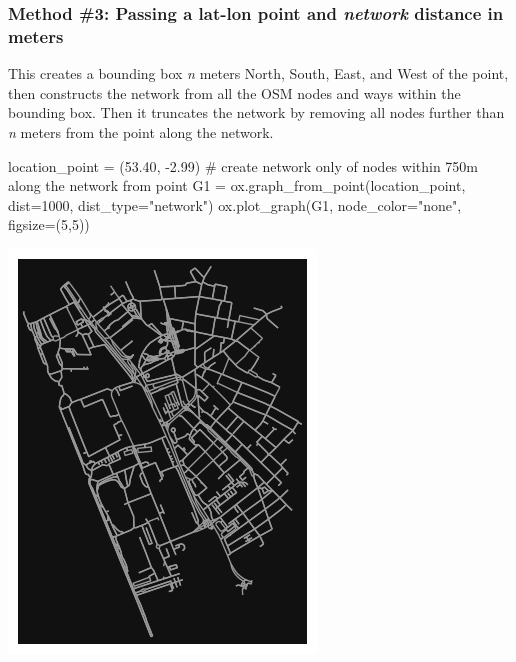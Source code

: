 \documentclass[
  letterpaper,
  DIV=11,
  numbers=noendperiod]{scrreprt}
\newenvironment{Shaded}{\begin{snugshade}}{\end{snugshade}}
\newcommand{\CommentTok}[1]{\textcolor[rgb]{0.37,0.37,0.37}{#1}}
\newcommand{\DecValTok}[1]{\textcolor[rgb]{0.68,0.00,0.00}{#1}}
\newcommand{\FloatTok}[1]{\textcolor[rgb]{0.68,0.00,0.00}{#1}}
\newcommand{\NormalTok}[1]{\textcolor[rgb]{0.00,0.23,0.31}{#1}}
\newcommand{\OperatorTok}[1]{\textcolor[rgb]{0.37,0.37,0.37}{#1}}
\newcommand{\StringTok}[1]{\textcolor[rgb]{0.13,0.47,0.30}{#1}}
\begin{document}
\subsubsection{\texorpdfstring{Method \#3: Passing a lat-lon point and
\emph{network} distance in
meters}{Method \#3: Passing a lat-lon point and network distance in meters}}\label{method-3-passing-a-lat-lon-point-and-network-distance-in-meters}

This creates a bounding box \emph{n} meters North, South, East, and West
of the point, then constructs the network from all the OSM nodes and
ways within the bounding box. Then it truncates the network by removing
all nodes further than \emph{n} meters from the point along the network.

\begin{Shaded}
\begin{Highlighting}[]
\NormalTok{location\_point }\OperatorTok{=}\NormalTok{ (}\FloatTok{53.40}\NormalTok{, }\OperatorTok{{-}}\FloatTok{2.99}\NormalTok{)}
\CommentTok{\# create network only of nodes within 750m along the network from point}
\NormalTok{G1 }\OperatorTok{=}\NormalTok{ ox.graph\_from\_point(location\_point, dist}\OperatorTok{=}\DecValTok{1000}\NormalTok{, dist\_type}\OperatorTok{=}\StringTok{"network"}\NormalTok{)}
\NormalTok{ox.plot\_graph(G1, node\_color}\OperatorTok{=}\StringTok{"none"}\NormalTok{, figsize}\OperatorTok{=}\NormalTok{(}\DecValTok{5}\NormalTok{,}\DecValTok{5}\NormalTok{))}
\end{Highlighting}
\end{Shaded}

\includegraphics{labs/w07_OSM_files/figure-pdf/cell-8-output-1.png}
\end{document}
